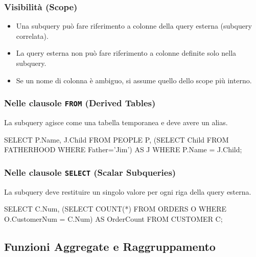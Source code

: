 \documentclass{article}
\begin{document}
	\subsubsection{Visibilità (Scope)}
	\begin{itemize}
		\item Una subquery può fare riferimento a colonne della query esterna (subquery correlata).
		\item La query esterna non può fare riferimento a colonne definite solo nella subquery.
		\item Se un nome di colonna è ambiguo, si assume quello dello scope più interno.
	\end{itemize}
	
	\subsubsection{Nelle clausole \texttt{FROM} (Derived Tables)}
	La subquery agisce come una tabella temporanea e deve avere un alias.
	\begin{sqlcode}
		SELECT P.Name, J.Child
		FROM PEOPLE P, (SELECT Child FROM FATHERHOOD WHERE Father='Jim') AS J
		WHERE P.Name = J.Child;
	\end{sqlcode}
	
	\subsubsection{Nelle clausole \texttt{SELECT} (Scalar Subqueries)}
	La subquery deve restituire un singolo valore per ogni riga della query esterna.
	\begin{sqlcode}
		SELECT C.Num, (SELECT COUNT(*) FROM ORDERS O WHERE O.CustomerNum = C.Num) AS OrderCount
		FROM CUSTOMER C;
	\end{sqlcode}
	
	\subsection{Funzioni Aggregate e Raggruppamento}
	
\end{document}
